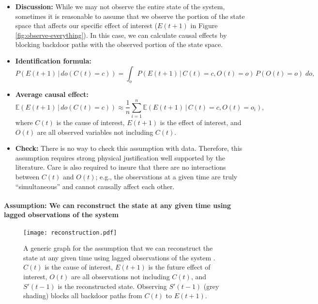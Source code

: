 \documentclass[12pt]{article}
\begin{document}
\begin{itemize}
\item \textbf{Discussion:} While we may not observe the entire state
  of the system, sometimes it is reasonable to assume that we observe
  the portion of the state space that affects our specific effect of
  interest ($E(t+1)$ in Figure \ref{fig:observe-everything}). In this
  case, we can calculate causal effects by blocking backdoor paths
  with the observed portion of the state space.
\item \textbf{Identification formula:}
  \begin{equation*}
    P(E(t+1) \, | \, do(C(t) = c)) = \int_{o} P(E(t+1) \, | \, C(t) = c,
    O(t) = o) \, P(O(t)=o) \; d o,
  \end{equation*}
\item \textbf{Average causal effect:}
  \begin{equation*}
    \mathbb{E}(E(t+1) \, | \, do(C(t) = c)) \approx \frac{1}{n}
    \sum_{i=1}^n \mathbb{E}(E(t+1) \, | \, C(t)=c, O(t)=o_i),
  \end{equation*}
  where $C(t)$ is the cause of interest, $E(t+1)$ is the effect of
  interest, and $O(t)$ are all observed variables not including $C(t)$.
\item \textbf{Check:} There is no way to check this assumption with
  data. Therefore, this assumption requires strong physical
  justification well supported by the literature. Care is also
  required to insure that there are no interactions between $C(t)$ and
  $O(t)$; e.g., the observations at a given time are truly
  ``simultaneous'' and cannot causally affect each other.
\end{itemize}

\newpage

\paragraph{Assumption: We can reconstruct the state at any given time
  using lagged observations of the system}

\begin{figure}[H]
  \texttt{[image: reconstruction.pdf]}
  \caption{A generic graph for the assumption that we can reconstruct
    the state at any given time using lagged observations of the
    system \citep{takens1981detecting}. $C(t)$ is the cause of
    interest, $E(t+1)$ is the future effect of interest, $O(t)$ are
    all observations not including $C(t)$, and $S'(t-1)$ is the
    reconstructed state. Observing $S'(t-1)$ (grey shading) blocks all
    backdoor paths from $C(t)$ to $E(t+1)$.}
  \label{fig:reconstruction}
\end{figure}
\end{document}
